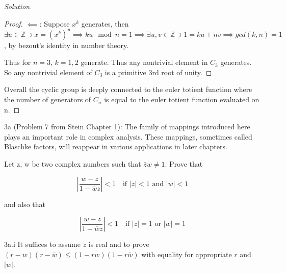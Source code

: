 \documentclass{article}
\newcommand{\Z}{\mathbb{Z}}
\newcommand{\abs}[1]{\left\lvert #1\right\rvert}
\newenvironment{solution}
{\renewcommand\qedsymbol{$\blacksquare$}\begin{proof}[Solution]}
{\end{proof}}
\begin{document}
\begin{solution}
\begin{proof}
        $\impliedby$: Suppose $x^k$ generates, then $\exists u \in \Z \ni x = (x^k)^u \implies ku \mod n = 1 \implies \exists u, v \in \Z \ni 1 = ku + nv \implies gcd(k, n) = 1$, by bezout's identity in number theory.
        
        
        Thus for $n = 3$, $k = 1, 2$ generate. Thus any nontrivial element in $C_3$ generates. So any nontrivial element of $C_3$ is a primitive 3rd root of unity.      
    \end{proof}

    Overall the cyclic group is deeply connected to the euler totient function where the number of generators of $C_n$ is equal to the euler totient function evaluated on n. 
\end{solution}


\begin{PROB}{3a}\label{Problem 3a.}
    (Problem 7 from Stein Chapter 1): The family of mappings introduced here plays an important role in complex analysis. These mappings, sometimes called Blaschke factors, will reappear in various applications in later chapters.

    Let z, w be two complex numbers such that $\bar{z}w \neq 1$. Prove that

    \[\abs{\frac{w - z}{1 - \bar{w}z}} < 1 \quad \text{if $|z| < 1$ and $|w| < 1$}\] 

    and also that 

    \[\abs{\frac{w - z}{1 - \bar{w}z}} < 1 \quad \text{if $|z| = 1$ or $|w| = 1$}\]
\end{PROB}
\begin{claim}{3a.i}\label{Claim 3ai.}
    It suffices to assume $z$ is real and to prove $(r - w)(r - \bar{w}) \leq (1 - rw)(1 - r\bar{w})$ with equality for appropriate $r$ and $|w|$. 
\end{claim}
\end{document}
